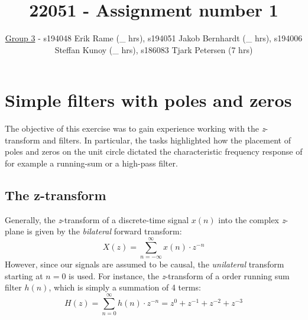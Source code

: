 \documentclass[journal]{IEEEtran}
\begin{document}
\title{22051 - Assignment number 1}
\author{\underline{Group 3} - s194048 Erik Rame (\_ hrs), s194051 Jakob Bernhardt (\_ hrs), s194006 Steffan Kunoy (\_ hrs), s186083 Tjark Petersen (7 hrs)}


\maketitle



\section{Simple filters with poles and zeros}
The objective of this exercise was to gain experience working with the \textit{z}-transform and filters. In particular, the tasks highlighted how the placement of poles and zeros on the unit circle dictated the characteristic frequency response of for example a running-sum or a high-pass filter.

\subsection{The z-transform}
Generally, the \textit{z}-transform of a discrete-time signal $x(n)$ into the complex \textit{z}-plane is given by the \textit{bilateral} forward transform: 
\begin{equation}
\label{eqn:z_transform}
    X(z) = \sum_{n=-\infty}^{\infty} x(n) \cdot z^{-n}
\end{equation}
However, since our signals are assumed to be causal, the \textit{unilateral} transform starting at $n=0$ is used. For instance, the \textit{z}-transform of a  order running sum filter $h(n)$, which is simply a summation of 4 terms: 
\begin{equation}
\label{eqn:third_order_rs}
    H(z) = \sum_{n=0}^{\infty} h(n) \cdot z^{-n} = z^{0} + z^{-1} + z^{-2} + z^{-3} 
\end{equation}
\end{document}
